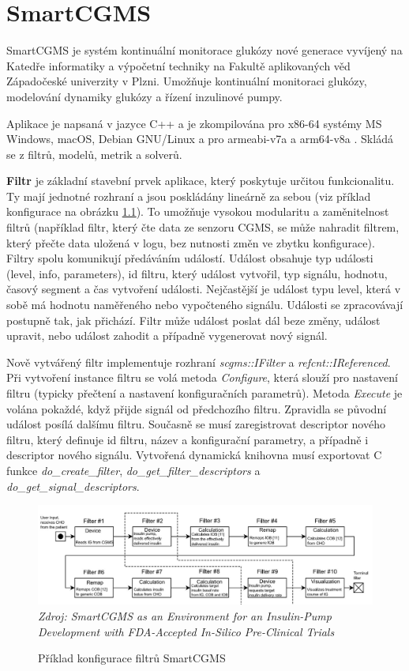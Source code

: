 \chapter{SmartCGMS}

SmartCGMS je systém kontinuální monitorace glukózy nové generace vyvíjený na Katedře informatiky a výpočetní techniky na Fakultě aplikovaných věd Západočeské univerzity v Plzni. Umožňuje kontinuální monitoraci glukózy, modelování dynamiky glukózy a řízení inzulinové pumpy.

Aplikace je napsaná v jazyce C++ a je zkompilována pro x86-64 systémy MS Windows, macOS, Debian GNU/Linux a pro armeabi-v7a a arm64-v8a \citep{cgms.koutny}. Skládá se z filtrů, modelů, metrik a solverů.

\textbf{Filtr} je základní stavební prvek aplikace, který poskytuje určitou funkcionalitu. Ty mají jednotné rozhraní a jsou poskládány lineárně za sebou (viz příklad konfigurace na obrázku \ref{fig:scgms_filters}). To umožňuje vysokou modularitu a zaměnitelnost filtrů (například filtr, který čte data ze senzoru CGMS, se může nahradit filtrem, který přečte data uložená v logu, bez nutnosti změn ve zbytku konfigurace). Filtry spolu komunikují předáváním událostí. Událost obsahuje typ události (level, info, parameters), id filtru, který událost vytvořil, typ signálu, hodnotu, časový segment a čas vytvoření události. Nejčastější je událost typu level, která v sobě má hodnotu naměřeného nebo vypočteného signálu. Události se zpracovávají postupně tak, jak přichází. Filtr může událost poslat dál beze změny, událost upravit, nebo událost zahodit a případně vygenerovat nový signál.

Nově vytvářený filtr implementuje rozhraní \textit{scgms::IFilter} a \textit{refcnt::IReferenced}. Při vytvoření instance filtru se volá metoda \textit{Configure}, která slouží pro nastavení filtru (typicky přečtení a nastavení konfiguračních parametrů). Metoda \textit{Execute} je volána pokaždé, když přijde signál od předchozího filtru. Zpravidla se původní událost posílá dalšímu filtru. Současně se musí zaregistrovat descriptor nového filtru, který definuje id filtru, název a konfigurační parametry, a případně i descriptor nového signálu. Vytvořená dynamická knihovna musí exportovat C funkce \textit{do\_create\_filter}, \textit{do\_get\_filter\_descriptors} a\\ \textit{do\_get\_signal\_descriptors}.

\begin{figure}[H]
\caption{Příklad konfigurace filtrů SmartCGMS}
\label{fig:scgms_filters}
\centering
\includegraphics[width=1\textwidth]{img/scgms/filters.jpg}
\textit{Zdroj: SmartCGMS as an Environment for an Insulin-Pump  Development with FDA-Accepted In-Silico Pre-Clinical Trials \citep{cgms.ubl}}
\end{figure}

